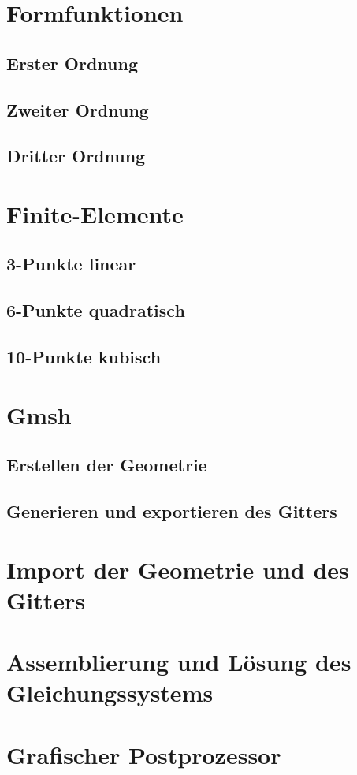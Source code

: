 \documentclass[12pt,a4paper]{scrartcl}
\begin{document}







\section{Formfunktionen}
\subsection{Erster Ordnung}
\subsection{Zweiter Ordnung}
\subsection{Dritter Ordnung}
\section{Finite-Elemente}
\subsection{3-Punkte linear}
\subsection{6-Punkte quadratisch}
\subsection{10-Punkte kubisch}

\section{Gmsh}
\subsection{Erstellen der Geometrie}
\subsection{Generieren und exportieren des Gitters}

\section{Import der Geometrie und des Gitters}
\section{Assemblierung und Lösung des Gleichungssystems}

\section{Grafischer Postprozessor}



\newpage
{}

\end{document}
